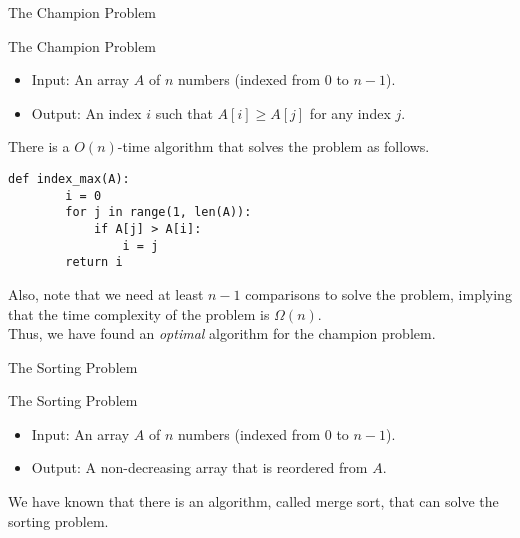 \documentclass{beamer}
\begin{document}
\begin{frame}[fragile]{The Champion Problem}
  \begin{block}{The Champion Problem}
    \begin{itemize}
      \item Input: An array $A$ of $n$ numbers (indexed from $0$ to $n-1$).
      \item Output: An index $i$ such that $A[i] \geq A[j]$ for any index $j$.
      \pause
    \end{itemize}
  \end{block}
  There is a $O(n)$-time algorithm that solves the problem as follows. \pause
  \begin{block}{}
    \scriptsize
    \begin{lstlisting}[gobble=4]
    def index_max(A):
        i = 0
        for j in range(1, len(A)):
            if A[j] > A[i]:
                i = j
        return i
    \end{lstlisting}
    \pause
  \end{block}
  Also, note that we need at least $n-1$ comparisons to solve the problem,
  implying that the time complexity of the problem is $\Omega(n)$. \pause
  \\[.5em]
  Thus, we have found an \emph{optimal} algorithm for the champion problem.
\end{frame}

\begin{frame}{The Sorting Problem}
  \begin{block}{The Sorting Problem}
    \begin{itemize}
      \item Input: An array $A$ of $n$ numbers (indexed from $0$ to $n-1$).
      \item Output: A non-decreasing array that is reordered from $A$.
      \pause
    \end{itemize}
  \end{block}
  We have known that there is an algorithm, called merge sort, that can solve
  the sorting problem.
\end{frame}
\end{document}
